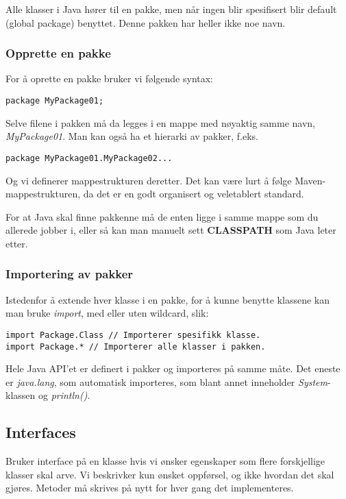 \documentclass[11pt]{article}
\begin{document}
Alle klasser i Java hører til en pakke, men når ingen blir spesifisert
blir default (global package) benyttet. Denne pakken har heller ikke
noe navn.
\subsubsection{Opprette en pakke}
\label{sec-13-1-1}

For å oprette en pakke bruker vi følgende syntax:


\begin{verbatim}
package MyPackage01;
\end{verbatim}

Selve filene i pakken må da legges i en mappe med nøyaktig samme navn,
\emph{\/MyPackage01\/}. Man kan også ha et hierarki av pakker, f.eks. 


\begin{verbatim}
package MyPackage01.MyPackage02...
\end{verbatim}

Og vi definerer mappestrukturen deretter. Det kan være lurt å følge
Maven-mappestrukturen, da det er en godt organisert og veletablert
standard. 

For at Java skal finne pakkenne må de enten ligge i samme mappe som du
allerede jobber i, eller så kan man manuelt sett \textbf{CLASSPATH} som Java
leter etter.
\subsubsection{Importering av pakker}
\label{sec-13-1-2}

Istedenfor å extende hver klasse i en pakke, for å kunne benytte
klassene kan man bruke \emph{import}, med eller uten wildcard, slik:


\begin{verbatim}
import Package.Class // Importerer spesifikk klasse.
import Package.* // Importerer alle klasser i pakken.
\end{verbatim}

Hele Java API'et er definert i pakker og importeres på samme måte. Det
eneste er \emph{java.lang}, som automatisk importeres, som blant annet
inneholder \emph{System}-klassen og \emph{println()}.
\subsection{Interfaces}
\label{sec-13-2}

Bruker interface på en klasse hvis vi ønsker egenskaper som flere
forskjellige klasser skal arve. Vi beskrivker kun ønsket oppførsel, og
ikke hvordan det skal gjøres. Metoder må skrives på nytt for hver
gang det implementeres. 
\end{document}
